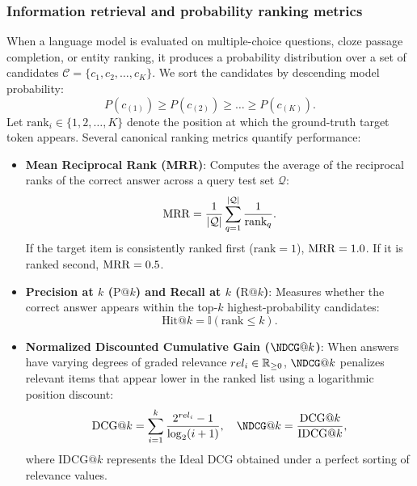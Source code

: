 \documentclass[../../main.tex]{subfiles}
\begin{document}
\subsubsection{Information retrieval and probability ranking metrics}
When a language model is evaluated on multiple-choice questions, cloze passage completion, or entity ranking, it produces a probability distribution over a set of candidates $\mathcal{C} = \{c_1, c_2, \dots, c_K\}$. We sort the candidates by descending model probability:
\begin{equation*}
P(c_{(1)}) \ge P(c_{(2)}) \ge \dots \ge P(c_{(K)}).
\end{equation*}
Let $\text{rank}_i \in \{1, 2, \dots, K\}$ denote the position at which the ground-truth target token appears. Several canonical ranking metrics quantify performance:
\begin{itemize}
    \item \textbf{Mean Reciprocal Rank (MRR)}: Computes the average of the reciprocal ranks of the correct answer across a query test set $\mathcal{Q}$:
    \begin{equation}
    \label{eq:mrr_def}
    \mathrm{MRR} = \frac{1}{|\mathcal{Q}|} \sum_{q=1}^{|\mathcal{Q}|} \frac{1}{\text{rank}_q}.
    \end{equation}
    If the target item is consistently ranked first ($\text{rank} = 1$), $\mathrm{MRR} = 1.0$. If it is ranked second, $\mathrm{MRR} = 0.5$.
    \item \textbf{Precision at $k$ ($\text{P}@k$) and Recall at $k$ ($\text{R}@k$)}: Measures whether the correct answer appears within the top-$k$ highest-probability candidates:
    \begin{equation}
    \label{eq:hit_at_k}
    \text{Hit}@k = \mathbb{I}(\text{rank} \le k).
    \end{equation}
    \item \textbf{Normalized Discounted Cumulative Gain ($\NDCG@k$)}: When answers have varying degrees of graded relevance $rel_i \in \mathbb{R}_{\ge 0}$, $\NDCG@k$ penalizes relevant items that appear lower in the ranked list using a logarithmic position discount:
    \begin{equation}
    \label{eq:dcg_def}
    \text{DCG}@k = \sum_{i=1}^k \frac{2^{rel_i} - 1}{\log_2(i + 1)}, \quad \NDCG@k = \frac{\text{DCG}@k}{\text{IDCG}@k},
    \end{equation}
    where $\text{IDCG}@k$ represents the Ideal DCG obtained under a perfect sorting of relevance values.
\end{itemize}
\end{document}
